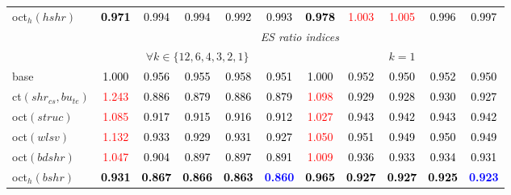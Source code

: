\begin{tabular}[t]{l|>{}cccc>{}c|ccccc}
oct$_h(hshr)$ & \textcolor{black}{\textbf{0.971}} & \textcolor{black}{0.994} & \textcolor{black}{0.994} & \textcolor{black}{0.992} & \textcolor{black}{0.993} & \textcolor{black}{\textbf{0.978}} & \textcolor{red}{1.003} & \textcolor{red}{1.005} & \textcolor{black}{0.996} & \textcolor{black}{0.997}\\
\addlinespace[0.3em]
\multicolumn{1}{c}{} & \multicolumn{10}{c}{\textit{ES ratio indices}}\\ \multicolumn{1}{c}{} & \multicolumn{5}{c}{\textbf{$\forall k \in \{12,6,4,3,2,1\}$}} & \multicolumn{5}{c}{\textbf{$k = 1$}}\\
base & \textcolor{black}{1.000} & \textcolor{black}{0.956} & \textcolor{black}{0.955} & \textcolor{black}{0.958} & \textcolor{black}{0.951} & \textcolor{black}{1.000} & \textcolor{black}{0.952} & \textcolor{black}{0.950} & \textcolor{black}{0.952} & \textcolor{black}{0.950}\\
ct$(shr_{cs}, bu_{te})$ & \textcolor{red}{1.243} & \textcolor{black}{0.886} & \textcolor{black}{0.879} & \textcolor{black}{0.886} & \textcolor{black}{0.879} & \textcolor{red}{1.098} & \textcolor{black}{0.929} & \textcolor{black}{0.928} & \textcolor{black}{0.930} & \textcolor{black}{0.927}\\
oct$(struc)$ & \textcolor{red}{1.085} & \textcolor{black}{0.917} & \textcolor{black}{0.915} & \textcolor{black}{0.916} & \textcolor{black}{0.912} & \textcolor{red}{1.027} & \textcolor{black}{0.943} & \textcolor{black}{0.942} & \textcolor{black}{0.943} & \textcolor{black}{0.942}\\
oct$(wlsv)$ & \textcolor{red}{1.132} & \textcolor{black}{0.933} & \textcolor{black}{0.929} & \textcolor{black}{0.931} & \textcolor{black}{0.927} & \textcolor{red}{1.050} & \textcolor{black}{0.951} & \textcolor{black}{0.949} & \textcolor{black}{0.950} & \textcolor{black}{0.949}\\
oct$(bdshr)$ & \textcolor{red}{1.047} & \textcolor{black}{0.904} & \textcolor{black}{0.897} & \textcolor{black}{0.897} & \textcolor{black}{0.891} & \textcolor{red}{1.009} & \textcolor{black}{0.936} & \textcolor{black}{0.933} & \textcolor{black}{0.934} & \textcolor{black}{0.931}\\
oct$_h(bshr)$ & \textcolor{black}{\textbf{0.931}} & \textcolor{black}{\textbf{0.867}} & \textcolor{black}{\textbf{0.866}} & \textcolor{black}{\textbf{0.863}} & \textcolor{blue}{\textbf{0.860}} & \textcolor{black}{\textbf{0.965}} & \textcolor{black}{\textbf{0.927}} & \textcolor{black}{\textbf{0.927}} & \textcolor{black}{\textbf{0.925}} & \textcolor{blue}{\textbf{0.923}}\\

\end{tabular}
